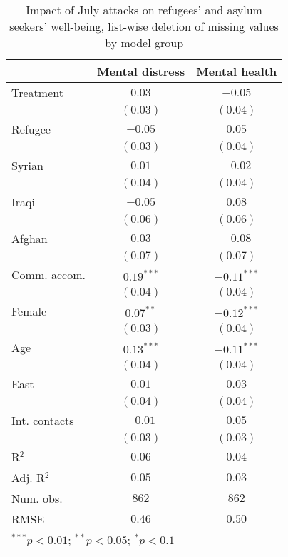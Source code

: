 
\begin{table}
\caption{Impact of July attacks on refugees' and asylum seekers' well-being, list-wise deletion of missing values by model group}
\begin{center}
\begin{tabular}{l c c}
\toprule
 & Mental distress & Mental health \\
\midrule
Treatment     & $0.03$       & $-0.05$       \\
              & $(0.03)$     & $(0.04)$      \\
Refugee       & $-0.05$      & $0.05$        \\
              & $(0.03)$     & $(0.04)$      \\
Syrian        & $0.01$       & $-0.02$       \\
              & $(0.04)$     & $(0.04)$      \\
Iraqi         & $-0.05$      & $0.08$        \\
              & $(0.06)$     & $(0.06)$      \\
Afghan        & $0.03$       & $-0.08$       \\
              & $(0.07)$     & $(0.07)$      \\
Comm. accom.  & $0.19^{***}$ & $-0.11^{***}$ \\
              & $(0.04)$     & $(0.04)$      \\
Female        & $0.07^{**}$  & $-0.12^{***}$ \\
              & $(0.03)$     & $(0.04)$      \\
Age           & $0.13^{***}$ & $-0.11^{***}$ \\
              & $(0.04)$     & $(0.04)$      \\
East          & $0.01$       & $0.03$        \\
              & $(0.04)$     & $(0.04)$      \\
Int. contacts & $-0.01$      & $0.05$        \\
              & $(0.03)$     & $(0.03)$      \\
\midrule
R$^2$         & $0.06$       & $0.04$        \\
Adj. R$^2$    & $0.05$       & $0.03$        \\
Num. obs.     & $862$        & $862$         \\
RMSE          & $0.46$       & $0.50$        \\
\bottomrule
\multicolumn{3}{l}{\scriptsize{$^{***}p<0.01$; $^{**}p<0.05$; $^{*}p<0.1$}}
\end{tabular}
\label{tab_mhealth_na_group}
\end{center}
\end{table}
